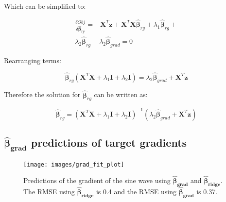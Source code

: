 \documentclass{article}
\begin{document}
Which can be simplified to: 

\begin{equation}
	\label{obj_derivative_simp}
	\begin{split}
	\frac{\delta Obj}{\delta \hat{\boldsymbol{\beta}}_{rg}} =  -\mathbf{X}^T \mathbf{z} + \mathbf{X}^T \mathbf{X} \hat{\boldsymbol{\beta}}_{rg} +  \lambda_1 \hat{\boldsymbol{\beta}}_{rg} +
	\\
	\lambda_2 \hat{\boldsymbol{\beta}}_{rg} - \lambda_2  \hat{\boldsymbol{\beta}}_{grad} = 0
	\end{split}
\end{equation}

Rearranging terms:

\begin{equation}
	\label{obj_derivative_rearange}
	\hat{\boldsymbol{\beta}}_{rg}(\mathbf{X}^T\mathbf{X} + \lambda_1 \mathbf{I} + \lambda_2 \mathbf{I}) = \lambda_2  \hat{\boldsymbol{\beta}}_{grad} +  \mathbf{X}^T \mathbf{z}
\end{equation}


Therefore the solution for $\hat{\boldsymbol{\beta}}_{rg}$ can be written as:

\begin{equation}
	\label{beta_rg_final}
	\hat{\boldsymbol{\beta}}_{rg} = (\mathbf{X}^T\mathbf{X} + \lambda_1 \mathbf{I} + \lambda_2 \mathbf{I})^{-1}(\lambda_2  \hat{\boldsymbol{\beta}}_{grad} +  \mathbf{X}^T \mathbf{z})
\end{equation}

\clearpage
\subsection{\texorpdfstring{$\boldsymbol{\hat{\beta}_{grad}}$}{Lg} predictions of target gradients}

\begin{figure}[!h]
	\centering
	\texttt{[image: images/grad\_fit\_plot]}
	\caption{Predictions of the gradient of the sine wave using $\boldsymbol{\hat{\beta}_{grad}}$ and $\boldsymbol{\hat{\beta}_{ridge}}$. The RMSE using $\boldsymbol{\hat{\beta}_{ridge}}$ is 0.4 and the RMSE using $\boldsymbol{\hat{\beta}_{grad}}$ is 0.37.} 
	\label{gradient_pred}
\end{figure}
\end{document}
